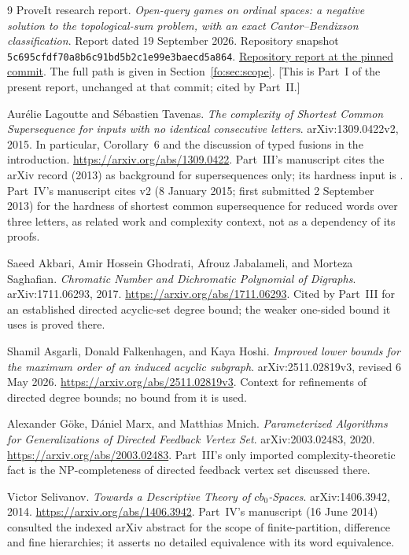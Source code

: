 \documentclass[11pt,letterpaper]{article}
\numberwithin{equation}{section}
\theoremstyle{definition}
\theoremstyle{remark}
\theoremstyle{definition}
\begin{document}
\begin{thebibliography}{9}
ProveIt research report.
\emph{Open-query games on ordinal spaces: a negative solution to the
topological-sum problem, with an exact Cantor--Bendixson classification}.
Report dated 19 September 2026. Repository snapshot
\texttt{5c695cfdf70a8b6c91bd5b2c1e99e3baecd5a864}.
\href{https://github.com/VladimirReshetnikov/ProveIt/tree/5c695cfdf70a8b6c91bd5b2c1e99e3baecd5a864/SetTheory/Cardinals/docs/reports/ordinals-and-order-types/games-on-ordinals/open-query-membership-games}{Repository report at the pinned commit}. The full path is given in Section~\ref{fo:sec:scope}.
[This is Part~I of the present report, unchanged at that commit; cited by
Part~II.]

Aur\'elie Lagoutte and S\'ebastien Tavenas.
\emph{The complexity of Shortest Common Supersequence for inputs with no
identical consecutive letters}. arXiv:1309.0422v2, 2015. In particular,
Corollary~6 and the discussion of typed fusions in the introduction.
\url{https://arxiv.org/abs/1309.0422}.
Part~III's manuscript cites the arXiv record (2013) as background for
supersequences only; its hardness input is \cite{GMM}. Part~IV's manuscript
cites v2 (8 January 2015; first submitted 2 September 2013) for the hardness
of shortest common supersequence for reduced words over three letters, as
related work and complexity context, not as a dependency of its proofs.

Saeed Akbari, Amir Hossein Ghodrati, Afrouz Jabalameli, and Morteza Saghafian.
\emph{Chromatic Number and Dichromatic Polynomial of Digraphs}.
arXiv:1711.06293, 2017.
\url{https://arxiv.org/abs/1711.06293}.
Cited by Part~III for an established directed acyclic-set degree bound; the
weaker one-sided bound it uses is proved there.

Shamil Asgarli, Donald Falkenhagen, and Kaya Hoshi.
\emph{Improved lower bounds for the maximum order of an induced acyclic
subgraph}. arXiv:2511.02819v3, revised 6 May 2026.
\url{https://arxiv.org/abs/2511.02819v3}.
Context for refinements of directed degree bounds; no bound from it is used.

Alexander G\"oke, D\'aniel Marx, and Matthias Mnich.
\emph{Parameterized Algorithms for Generalizations of Directed Feedback
Vertex Set}. arXiv:2003.02483, 2020.
\url{https://arxiv.org/abs/2003.02483}.
Part~III's only imported complexity-theoretic fact is the NP-completeness of
directed feedback vertex set discussed there.

Victor Selivanov.
\emph{Towards a Descriptive Theory of $cb_0$-Spaces}.
arXiv:1406.3942, 2014.
\url{https://arxiv.org/abs/1406.3942}.
Part~IV's manuscript (16 June 2014) consulted the indexed arXiv abstract for
the scope of finite-partition, difference and fine hierarchies; it asserts no
detailed equivalence with its word equivalence.

\end{thebibliography}
\end{document}
